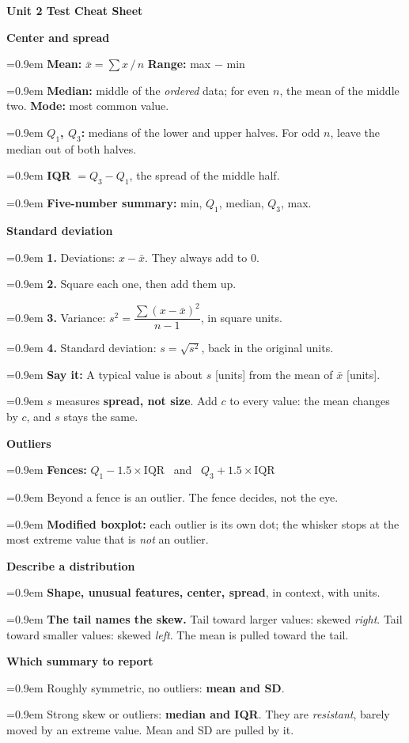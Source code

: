 \documentclass[10pt]{article}
\newlength{\sheetwd}\setlength{\sheetwd}{7.8in}
\newcommand{\sheethead}[1]{%
  \par\addvspace{8pt}\noindent
  {\color{cerulean}\sffamily\bfseries #1}\par\nopagebreak
  \vspace{-7pt}\noindent{\color{cerulean}\rule{\linewidth}{0.6pt}}\par\nopagebreak\vspace{-1pt}}
\newcommand{\sheetitem}[1]{\par\noindent\hangindent=0.9em\hangafter=1 #1\par}
\begin{document}
\begin{lrbox}{\sheet}%
\begin{minipage}[t]{\sheetwd}
\setlength{\parskip}{3.5pt}
\small
\noindent\colorbox{cerulean}{\parbox{\dimexpr\linewidth-2\fboxsep}{%
  \color{white}\textbf{\CourseHeaderName \hfill Unit 2 Test Cheat Sheet}}}

\vspace{1pt}
\begin{minipage}[t]{0.485\linewidth}
\sheethead{Center and spread}
\sheetitem{\textbf{Mean:} $\bar{x} = \sum x \,/\, n$ \quad \textbf{Range:} max $-$ min}
\sheetitem{\textbf{Median:} middle of the \emph{ordered} data; for even $n$, the mean of the
  middle two. \textbf{Mode:} most common value.}
\sheetitem{\textbf{$Q_1$, $Q_3$:} medians of the lower and upper halves. For odd $n$, leave
  the median out of both halves.}
\sheetitem{\textbf{IQR} $= Q_3 - Q_1$, the spread of the middle half.}
\sheetitem{\textbf{Five-number summary:} min, $Q_1$, median, $Q_3$, max.}

\sheethead{Standard deviation}
\sheetitem{\textbf{1.} Deviations: $x - \bar{x}$. They always add to $0$.}
\sheetitem{\textbf{2.} Square each one, then add them up.}
\sheetitem{\textbf{3.} Variance: $s^2 = \dfrac{\sum (x - \bar{x})^2}{n - 1}$, in square units.}
\sheetitem{\textbf{4.} Standard deviation: $s = \sqrt{s^2}$, back in the original units.}
\sheetitem{\textbf{Say it:} A typical value is about $s$ [units] from the mean of $\bar{x}$
  [units].}
\sheetitem{$s$ measures \textbf{spread, not size}. Add $c$ to every value: the mean changes by
  $c$, and $s$ stays the same.}

\sheethead{Outliers}
\sheetitem{\textbf{Fences:} $Q_1 - 1.5 \times \text{IQR}$ \ and \ $Q_3 + 1.5 \times \text{IQR}$}
\sheetitem{Beyond a fence is an outlier. The fence decides, not the eye.}
\sheetitem{\textbf{Modified boxplot:} each outlier is its own dot; the whisker stops at the most
  extreme value that is \emph{not} an outlier.}
\end{minipage}\hfill
\begin{minipage}[t]{0.485\linewidth}
\sheethead{Describe a distribution}
\sheetitem{\textbf{Shape, unusual features, center, spread}, in context, with units.}
\sheetitem{\textbf{The tail names the skew.} Tail toward larger values: skewed \emph{right}.
  Tail toward smaller values: skewed \emph{left}. The mean is pulled toward the tail.}

\sheethead{Which summary to report}
\sheetitem{Roughly symmetric, no outliers: \textbf{mean and SD}.}
\sheetitem{Strong skew or outliers: \textbf{median and IQR}. They are \emph{resistant}, barely
  moved by an extreme value. Mean and SD are pulled by it.}


\end{minipage}
\end{minipage}
\end{lrbox}
\end{document}

